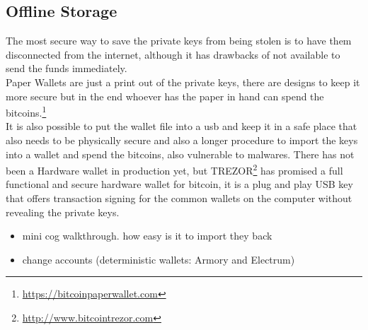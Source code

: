  


\subsection{Offline Storage}
\label{sec:offline storage}
The most secure way to save the private keys from being stolen is to have them disconnected from the internet, although it has drawbacks of not available to send the funds immediately.\\
Paper Wallets are just a print out of the private keys, there are designs to keep it more secure but in the end whoever has the paper in hand can spend the bitcoins.\footnote{\url {https://bitcoinpaperwallet.com}}\\
It is also possible to put the wallet file into a usb and keep it in a safe place that also needs to be physically secure and also a longer procedure to import the keys into a wallet and spend the bitcoins, also vulnerable to malwares. There has not been a Hardware wallet in production yet, but TREZOR\footnote{\url {http://www.bitcointrezor.com}} has promised a full functional and secure hardware wallet for bitcoin, it is a plug and play USB key that offers transaction signing for the common wallets on the computer without revealing the private keys.
\begin{itemize}
  \item mini cog walkthrough. how easy is it to import they back
  \item change accounts (\cf deterministic wallets: Armory and Electrum)
\end{itemize}

